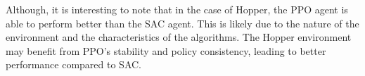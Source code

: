 \documentclass{article}
\begin{document}
Although, it is interesting to note that in the case of Hopper, the PPO agent
is able to perform better than the SAC agent. This is likely due to the nature
of the environment and the characteristics of the algorithms. The Hopper
environment may benefit from PPO's stability and policy consistency, leading to
better performance compared to SAC.
\end{document}

